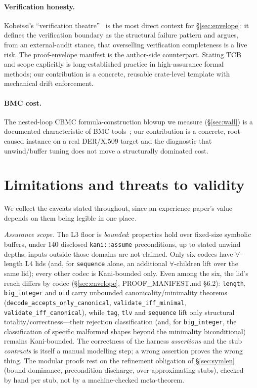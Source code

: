 \documentclass[10pt,twocolumn]{article}
\newcommand{\code}[1]{\texttt{\small #1}}
\begin{document}
\paragraph{Verification honesty.}
Kobeissi's ``verification theatre''~\cite{theatre} is the most direct context
for \S\ref{sec:envelope}: it defines the verification boundary as the
structural failure pattern and argues, from an external-audit stance, that
overselling verification completeness is a live risk. The proof-envelope
manifest is the author-side counterpart. Stating TCB and scope explicitly is
long-established practice in high-assurance formal methods; our contribution is
a concrete, reusable crate-level template with mechanical drift enforcement.

\paragraph{BMC cost.}
The nested-loop CBMC formula-construction blowup we measure
(\S\ref{sec:wall}) is a documented characteristic of BMC
tools~\cite{cbmcpath,spaceefficientbmc}; our contribution is a concrete,
root-caused instance on
a real DER/X.509 target and the diagnostic that unwind/buffer tuning does not
move a structurally dominated cost.

\section{Limitations and threats to validity}
\label{sec:limits}

We collect the caveats stated throughout, since an experience paper's value
depends on them being legible in one place.

\emph{Assurance scope.} The L3 floor is \emph{bounded}: properties hold over
fixed-size symbolic buffers, under 140 disclosed \code{kani::assume}
preconditions, up to stated unwind depths; inputs outside those domains are not
claimed. Only six codecs have $\forall$-length L4 lids (and, for \code{sequence}
alone, an additional $\forall$-children lift over the same lid); every other
codec is Kani-bounded only. Even among the six, the lid's reach differs by
codec (\S\ref{sec:envelope}, PROOF\_MANIFEST.md \S6.2): \code{length},
\code{big\_integer} and \code{oid} carry unbounded canonicality/minimality
theorems (\code{decode\_accepts\_only\_canonical}, \code{validate\_iff\_minimal},
\code{validate\_iff\_canonical}), while \code{tag}, \code{tlv} and
\code{sequence} lift only structural totality/correctness---their rejection
classification (and, for \code{big\_integer}, the classification of specific
malformed shapes beyond the minimality biconditional) remains Kani-bounded.
The correctness of the
harness \emph{assertions} and the stub \emph{contracts} is itself a manual
modelling step; a wrong assertion proves the wrong thing. The modular proofs
rest on the refinement obligation of \S\ref{sec:symlen} (bound dominance,
precondition discharge, over-approximating stubs), checked by hand per stub, not
by a machine-checked meta-theorem.
\end{document}
